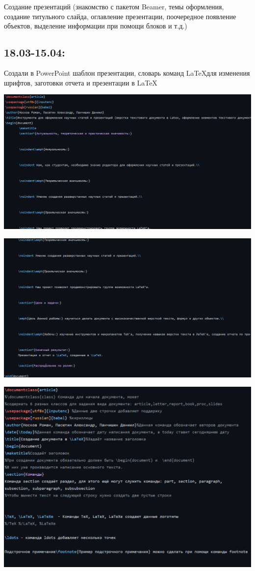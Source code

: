 \documentclass{article}
\begin{document}
	Создание презентаций (знакомство с пакетом Beamer, темы оформления, создание титульного слайда, оглавление презентации, поочередное появление объектов, выделение информации при помощи блоков и т.д.)
	
	\subsection*{18.03-15.04:}
	
	Создали в PowerPoint шаблон презентации, словарь команд \LaTeX для изменения шрифтов, заготовки отчета и презентации в \LaTeX
	
	\includegraphics{1}
	
	
	\includegraphics{2}
	
	
	\includegraphics{3}
	
\end{document}
